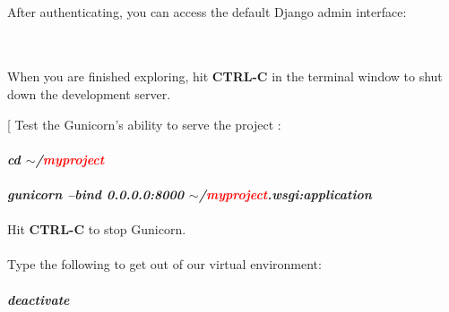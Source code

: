 \documentclass[a4paper]{article}
\makeatletter
\def\step{%
	\@ifnextchar[ \@myitem{\@noitemargtrue\@myitem[\@itemlabel]}}
\def\@myitem[#1]{\item[#1]\mbox{}\\}
\newenvironment{Step}{%
	\begin{enumerate}[label= \textbf {Step} \arabic*,align=left, leftmargin=1.0cm]%
	}{
\end{enumerate}%
}
\makeatother
\begin{document}
\begin{Step}
\begin{minipage}[t]{\linewidth}
	\raggedright
\end{minipage}
	\medskip \ \\	
	After authenticating, you can access the default Django admin interface:\\\\
\begin{minipage}[t]{\linewidth}
		\raggedright
\end{minipage}
	\medskip \ \\
	When you are finished exploring, hit \textbf{CTRL-C} in the terminal window to shut down the development server.

\step
Test the Gunicorn's ability to serve the project :\\ \\
\textbf{\emph{ cd $\sim$/\textcolor{red}{myproject}}}\\ \\
\textbf{\emph{ gunicorn --bind 0.0.0.0:8000 $\sim$/\textcolor{red}{myproject}.wsgi:application}}\\ \\

Hit \textbf{CTRL-C} to stop Gunicorn.\\\\
Type the following to get out of our virtual environment:\\\\
\textbf{\emph{ deactivate}}\\ \\


\end{Step}
\end{document}
